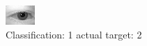 \begin{figure}[h!]
\begin{center}
\includegraphics[width=0.60\columnwidth]{figures/ID383_class_1_target_2.png}
\end{center}
\caption{ Classification: 1 actual target: 2}
\label{fig:ID383_class_1_target_2}
\end{figure}
